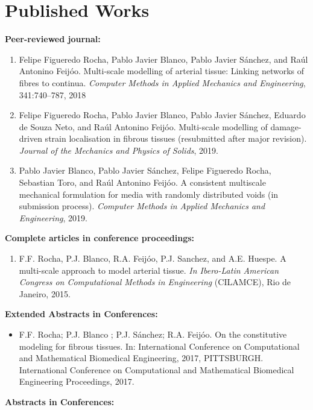 \documentclass[letterpaper]{twentysecondcv} %
\begin{document}
\section{Published Works}
\item \textbf{Peer-reviewed journal:}
\begin{enumerate}
\item Felipe Figueredo Rocha, Pablo Javier Blanco, Pablo Javier Sánchez, and Raúl Antonino Feijóo. Multi-scale modelling of arterial tissue: Linking networks of fibres to continua. \textit{Computer Methods in Applied Mechanics and Engineering}, 341:740–787, 2018
\item Felipe Figueredo Rocha, Pablo Javier Blanco, Pablo Javier Sánchez, Eduardo de Souza Neto, and Raúl Antonino Feijóo. Multi-scale modelling of damage-driven strain localisation in fibrous tissues (resubmitted after major revision). \textit{Journal of the Mechanics and Physics of Solids}, 2019.
\item Pablo Javier Blanco, Pablo Javier Sánchez, Felipe Figueredo Rocha, Sebastian Toro, and Raúl Antonino Feijóo. A consistent multiscale mechanical formulation for media with randomly distributed voids (in submission process). \textit{Computer Methods in Applied Mechanics and Engineering}, 2019.
\end{enumerate}	
\vskip -0.1cm
\item \textbf{Complete articles in conference proceedings:} 
\begin{enumerate}
	\item F.F. Rocha, P.J. Blanco, R.A. Feijóo, P.J. Sanchez, and A.E. Huespe. A multi-scale approach to model arterial tissue. \textit{In Ibero-Latin American Congress on Computational Methods in Engineering} (CILAMCE), Rio
	de Janeiro, 2015.
\end{enumerate}	
\vskip -0.1cm
\item \textbf{Extended Abstracts in Conferences:}
\begin{itemize}
\item F.F. Rocha; P.J. Blanco ; P.J. Sánchez; R.A. Feijóo. On the constitutive modeling for fibrous tissues. In: International Conference on Computational and Mathematical Biomedical Engineering, 2017, PITTSBURGH. International Conference on Computational and Mathematical Biomedical Engineering Proceedings, 2017.
\end{itemize}
\item \textbf{Abstracts in Conferences:} 
\end{document}
